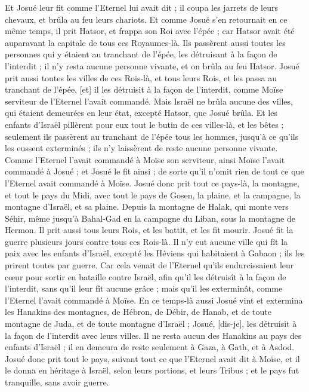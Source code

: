 \begin{multicols}{2}
Et Josué leur fit comme l'Eternel lui avait dit ; il coupa les jarrets de leurs chevaux, et brûla au feu leurs chariots.
Et comme Josué s'en retournait en ce même temps, il prit Hatsor, et frappa son Roi avec l'épée ; car Hatsor avait été auparavant la capitale de tous ces Royaumes-là.
Ils passèrent aussi toutes les personnes qui y étaient au tranchant de l'épée, les détruisant à la façon de l'interdit ; il n'y resta aucune personne vivante, et on brûla au feu Hatsor.
Josué prit aussi toutes les villes de ces Rois-là, et tous leurs Rois, et les passa au tranchant de l'épée, [et] il les détruisit à la façon de l'interdit, comme Moïse serviteur de l'Eternel l'avait commandé.
Mais Israël ne brûla aucune des villes, qui étaient demeurées en leur état, excepté Hatsor, que Josué brûla.
Et les enfants d'Israël pillèrent pour eux tout le butin de ces villes-là, et les bêtes ; seulement ils passèrent au tranchant de l'épée tous les hommes, jusqu'à ce qu'ils les eussent exterminés ; ils n'y laissèrent de reste aucune personne vivante.
Comme l'Eternel l'avait commandé à Moïse son serviteur, ainsi Moïse l'avait commandé à Josué ; et Josué le fit ainsi ; de sorte qu'il n'omit rien de tout ce que l'Eternel avait commandé à Moïse.
Josué donc prit tout ce pays-là, la montagne, et tout le pays du Midi, avec tout le pays de Gosen, la plaine, et la campagne, la montagne d'Israël, et sa plaine.
Depuis la montagne de Halak, qui monte vers Séhir, même jusqu'à Bahal-Gad en la campagne du Liban, sous la montagne de Hermon. Il prit aussi tous leurs Rois, et les battit, et les fit mourir.
Josué fit la guerre plusieurs jours contre tous ces Rois-là.
Il n'y eut aucune ville qui fît la paix avec les enfants d'Israël, excepté les Héviens qui habitaient à Gabaon ; ils les prirent toutes par guerre.
Car cela venait de l'Eternel qu'ils endurcissaient leur cœur pour sortir en bataille contre Israël, afin qu'il les détruisît à la façon de l'interdit, sans qu'il leur fît aucune grâce ; mais qu'il les exterminât, comme l'Eternel l'avait commandé à Moïse.
En ce temps-là aussi Josué vint et extermina les Hanakins des montagnes, de Hébron, de Débir, de Hanab, et de toute montagne de Juda, et de toute montagne d'Israël ; Josué, [dis-je], les détruisit à la façon de l'interdit avec leurs villes.
Il ne resta aucun des Hanakins au pays des enfants d'Israël ; il en demeura de reste seulement à Gaza, à Gath, et à Asdod.
Josué donc prit tout le pays, suivant tout ce que l'Eternel avait dit à Moïse, et il le donna en héritage à Israël, selon leurs portions, et leurs Tribus ; et le pays fut tranquille, sans avoir guerre.

\end{multicols}

